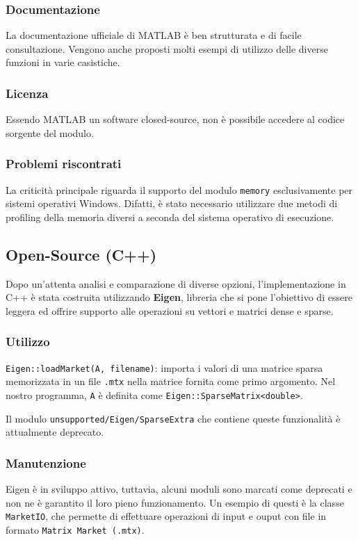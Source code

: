 \documentclass[11pt,italian]{article}
\begin{document}
\subsubsection*{Documentazione}
La documentazione ufficiale di MATLAB è ben strutturata e di facile consultazione. Vengono anche proposti molti esempi di utilizzo delle diverse funzioni in varie casistiche.

\subsubsection*{Licenza}
Essendo MATLAB un software closed-source, non è possibile accedere al codice sorgente del modulo.

\subsubsection*{Problemi riscontrati}
La criticità principale riguarda il supporto del modulo \lstinline{memory} esclusivamente per sistemi operativi Windows. Difatti, è stato necessario utilizzare due metodi di profiling della memoria diversi a seconda del sistema operativo di esecuzione.

\subsection{Open-Source (C++)}
Dopo un'attenta analisi e comparazione di diverse opzioni, l'implementazione in C++ è stata costruita utilizzando \textbf{Eigen},  libreria che si pone l'obiettivo di essere leggera ed offrire supporto alle operazioni su vettori e matrici dense e sparse.

\subsubsection*{Utilizzo}
\lstinline{Eigen::loadMarket(A, filename)}: importa i valori di una matrice sparsa memorizzata in un file \lstinline{.mtx} nella matrice fornita come primo argomento. Nel nostro programma, \lstinline{A} è definita come \lstinline{Eigen::SparseMatrix<double>}.

Il modulo \lstinline{unsupported/Eigen/SparseExtra} che contiene queste funzionalità è attualmente deprecato.

\subsubsection*{Manutenzione}
Eigen è in sviluppo attivo, tuttavia, alcuni moduli sono marcati come deprecati e non ne è garantito il loro pieno funzionamento. Un esempio di questi è la classe \lstinline{MarketIO}, che permette di effettuare operazioni di input e ouput con file in formato \lstinline{Matrix Market (.mtx)}.
\end{document}
